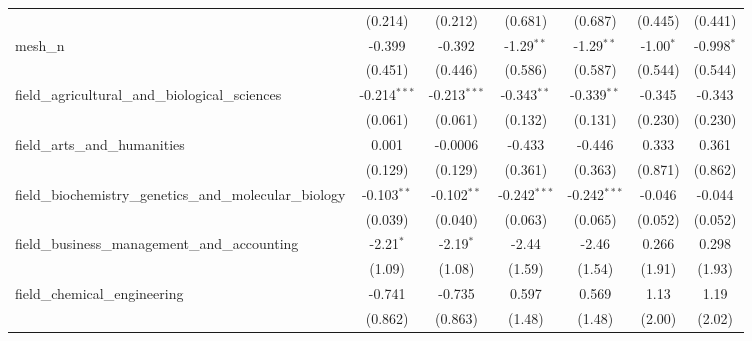 \begin{tabular}{lcccccc}
                                                               & (0.214)        & (0.212)        & (0.681)        & (0.687)        & (0.445)        & (0.441)\\   
   mesh\_n                                                     & -0.399         & -0.392         & -1.29$^{**}$   & -1.29$^{**}$   & -1.00$^{*}$    & -0.998$^{*}$\\   
                                                               & (0.451)        & (0.446)        & (0.586)        & (0.587)        & (0.544)        & (0.544)\\   
   field\_agricultural\_and\_biological\_sciences              & -0.214$^{***}$ & -0.213$^{***}$ & -0.343$^{**}$  & -0.339$^{**}$  & -0.345         & -0.343\\   
                                                               & (0.061)        & (0.061)        & (0.132)        & (0.131)        & (0.230)        & (0.230)\\   
   field\_arts\_and\_humanities                                & 0.001          & -0.0006        & -0.433         & -0.446         & 0.333          & 0.361\\   
                                                               & (0.129)        & (0.129)        & (0.361)        & (0.363)        & (0.871)        & (0.862)\\   
   field\_biochemistry\_genetics\_and\_molecular\_biology      & -0.103$^{**}$  & -0.102$^{**}$  & -0.242$^{***}$ & -0.242$^{***}$ & -0.046         & -0.044\\   
                                                               & (0.039)        & (0.040)        & (0.063)        & (0.065)        & (0.052)        & (0.052)\\   
   field\_business\_management\_and\_accounting                & -2.21$^{*}$    & -2.19$^{*}$    & -2.44          & -2.46          & 0.266          & 0.298\\   
                                                               & (1.09)         & (1.08)         & (1.59)         & (1.54)         & (1.91)         & (1.93)\\   
   field\_chemical\_engineering                                & -0.741         & -0.735         & 0.597          & 0.569          & 1.13           & 1.19\\   
                                                               & (0.862)        & (0.863)        & (1.48)         & (1.48)         & (2.00)         & (2.02)\\   

\end{tabular}
